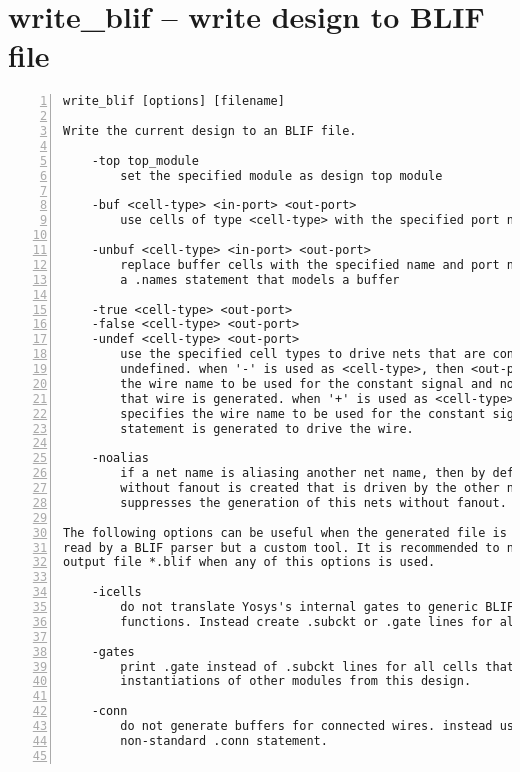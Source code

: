 \section{write\_blif -- write design to BLIF file}
\label{cmd:write_blif}
\begin{lstlisting}[numbers=left,frame=single]
    write_blif [options] [filename]

Write the current design to an BLIF file.

    -top top_module
        set the specified module as design top module

    -buf <cell-type> <in-port> <out-port>
        use cells of type <cell-type> with the specified port names for buffers

    -unbuf <cell-type> <in-port> <out-port>
        replace buffer cells with the specified name and port names with
        a .names statement that models a buffer

    -true <cell-type> <out-port>
    -false <cell-type> <out-port>
    -undef <cell-type> <out-port>
        use the specified cell types to drive nets that are constant 1, 0, or
        undefined. when '-' is used as <cell-type>, then <out-port> specifies
        the wire name to be used for the constant signal and no cell driving
        that wire is generated. when '+' is used as <cell-type>, then <out-port>
        specifies the wire name to be used for the constant signal and a .names
        statement is generated to drive the wire.

    -noalias
        if a net name is aliasing another net name, then by default a net
        without fanout is created that is driven by the other net. This option
        suppresses the generation of this nets without fanout.

The following options can be useful when the generated file is not going to be
read by a BLIF parser but a custom tool. It is recommended to not name the
output file *.blif when any of this options is used.

    -icells
        do not translate Yosys's internal gates to generic BLIF logic
        functions. Instead create .subckt or .gate lines for all cells.

    -gates
        print .gate instead of .subckt lines for all cells that are not
        instantiations of other modules from this design.

    -conn
        do not generate buffers for connected wires. instead use the
        non-standard .conn statement.


\end{lstlisting}
